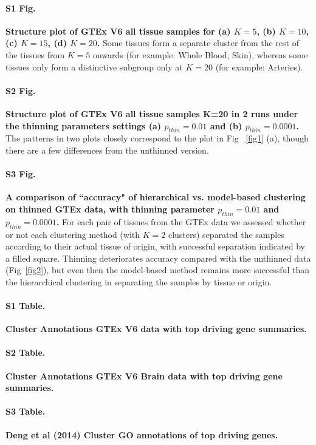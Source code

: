 \documentclass[10pt,letterpaper]{article}
\begin{document}
\paragraph*{S1 Fig.}
\label{figS0}
{\bf Structure plot of GTEx V6 all tissue samples for (a) $K=5$, (b) $K=10$, (c) $K=15$, (d) $K=20$.} Some tissues form a separate cluster from the rest of the tissues from $K=5$ onwards (for example: Whole Blood, Skin), whereas some tissues only form a distinctive subgroup only at $K=20$ (for example: Arteries).

\paragraph*{S2 Fig.}
\label{figS1}
{\bf Structure plot of GTEx V6 all tissue samples K=20 in 2 runs under the thinning parameters settings (a) $p_{thin}=0.01$ and (b) $p_{thin}=0.0001$.} The patterns in two plots closely correspond to the plot in Fig ~\ref{fig1} (a), though there are a few differences from the unthinned version.

\paragraph*{S3 Fig.}
\label{figS2}
{\bf A comparison of ``accuracy" of hierarchical vs. model-based clustering on thinned GTEx data, with thinning parameter $p_{thin}=0.01$ and $p_{thin}=0.0001$.}  For each pair of tissues from the GTEx data we assessed whether or not each clustering method (with $K=2$ clusters) separated the samples according to their actual tissue of origin, with successful separation indicated by a filled square. Thinning deteriorates accuracy compared with the unthinned data (Fig~\ref{fig2}), but even then the model-based method remains more successful than the hierarchical clustering in separating the samples by tissue or origin.

\paragraph*{S1 Table.}
\label{supptab1}
{\bf Cluster Annotations GTEx V6 data with top driving gene summaries.}

\paragraph*{S2 Table.}
\label{supptab2}
{\bf Cluster Annotations GTEx V6 Brain data with top driving gene summaries.}

\paragraph*{S3 Table.}
\label{supptab3}
{\bf Deng et al (2014) Cluster GO annotations of top driving genes.}
\end{document}
